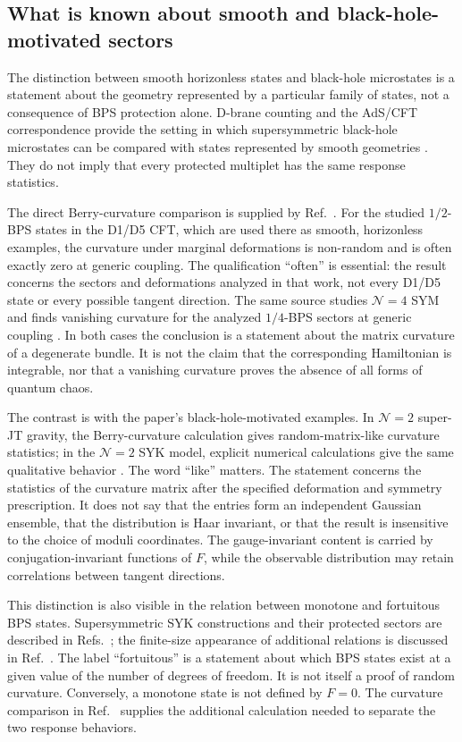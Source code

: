 \subsection{What is known about smooth and black-hole-motivated sectors}

The distinction between smooth horizonless states and black-hole microstates
is a statement about the geometry represented by a particular family of
states, not a consequence of BPS protection alone.  D-brane counting and the
AdS/CFT correspondence provide the setting in which supersymmetric black-hole
microstates can be compared with states represented by smooth geometries
\cite{stromingervafa1996,maldacena1998ads}.  They do not imply that every
protected multiplet has the same response statistics.

The direct Berry-curvature comparison is supplied by
Ref.~\cite{chen2026berry}.  For the studied $1/2$-BPS states in the D1/D5 CFT,
which are used there as smooth, horizonless examples, the curvature under
marginal deformations is non-random and is often exactly zero at generic
coupling.  The qualification ``often'' is essential: the result concerns the
sectors and deformations analyzed in that work, not every D1/D5 state or every
possible tangent direction.  The same source studies $\mathcal{N}=4$ SYM and
finds vanishing curvature for the analyzed $1/4$-BPS sectors at generic
  coupling \cite{chen2026berry}.  In both cases the conclusion is a statement about the matrix
curvature of a degenerate bundle.  It is not the claim that the corresponding
Hamiltonian is integrable, nor that a vanishing curvature proves the absence
of all forms of quantum chaos.

The contrast is with the paper's black-hole-motivated examples.  In
$\mathcal{N}=2$ super-JT gravity, the Berry-curvature calculation gives
random-matrix-like curvature statistics; in the $\mathcal{N}=2$ SYK model,
explicit numerical calculations give the same qualitative behavior
\cite{chen2026berry}.  The word ``like'' matters.  The statement concerns the
statistics of the curvature matrix after the specified deformation and
symmetry prescription.  It does not say that the entries form an independent
Gaussian ensemble, that the distribution is Haar invariant, or that the
result is insensitive to the choice of moduli coordinates.  The gauge-invariant
content is carried by conjugation-invariant functions of $F$, while the
observable distribution may retain correlations between tangent directions.

This distinction is also visible in the relation between monotone and
fortuitous BPS states.  Supersymmetric SYK constructions and their protected
sectors are described in Refs.~\cite{fu2017susy,maldacenastanford2016}; the
finite-size appearance of additional relations is discussed in
Ref.~\cite{chang2024fortuity}.  The label ``fortuitous'' is a statement about
which BPS states exist at a given value of the number of degrees of freedom.
It is not itself a proof of random curvature.  Conversely, a monotone state
is not defined by $F=0$.  The curvature comparison in
Ref.~\cite{chen2026berry} supplies the additional calculation needed to
separate the two response behaviors.

